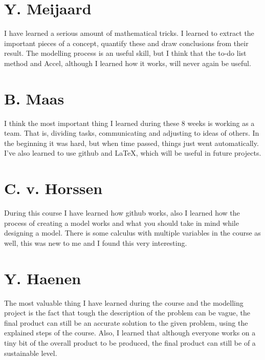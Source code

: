 \documentclass[a4paper, 11pt, notitlepage]{report}
\begin{document}
	\section*{Y. Meijaard}
	I have learned a serious amount of mathematical tricks. I learned to extract the important pieces of a concept, quantify these and draw conclusions from their result. The modelling process is an useful skill, but I think that the to-do list method and Accel, although I learned how it works, will never again be useful.
	
	\section*{B. Maas}
	I think the most important thing I learned during these 8 weeks is working as a team. That is, dividing tasks, communicating and adjusting to ideas of others. In the beginning it was hard, but when time passed, things just went automatically. I've also learned to use github and LaTeX, which will be useful in future projects.

\section*{C. v. Horssen} During this course I have learned how github works, also I learned how the process of creating a model works and what you should take in mind while designing a model. There is some calculus with multiple variables in the course as well, this was new to me and I found this very interesting.

\section*{Y. Haenen}

The most valuable thing I have learned during the course and the modelling project is the fact that tough the description of the problem can be vague, the final product can still be an accurate solution to the given problem, using the explained steps of the course. Also, I learned that although everyone works on a tiny bit of the overall product to be produced, the final product can still be of a sustainable level.
\end{document}
